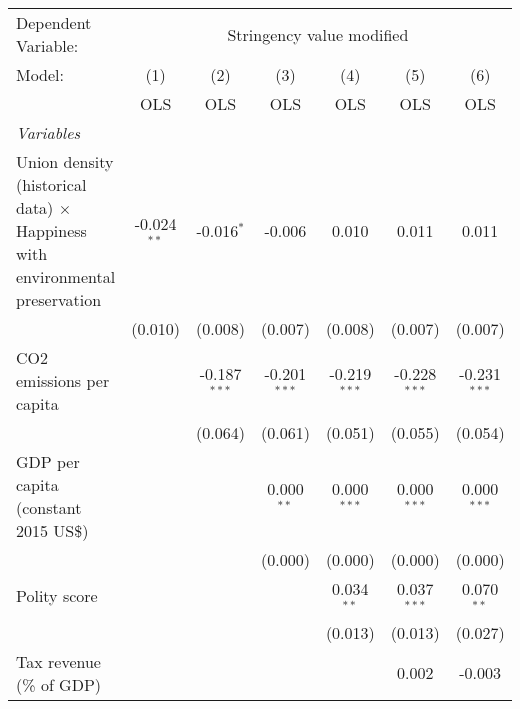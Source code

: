 
\begingroup
\centering
\begin{tabular}{lcccccc}
   \toprule
   Dependent Variable: & \multicolumn{6}{c}{Stringency value modified}\\
   Model:                                                                              & (1)           & (2)            & (3)            & (4)            & (5)            & (6)\\  
                                                                                       &  OLS          & OLS            & OLS            & OLS            & OLS            & OLS\\  
   \midrule
   \emph{Variables}\\
   Union density (historical data) $\times$ Happiness with environmental preservation  & -0.024$^{**}$ & -0.016$^{*}$   & -0.006         & 0.010          & 0.011          & 0.011\\   
                                                                                       & (0.010)       & (0.008)        & (0.007)        & (0.008)        & (0.007)        & (0.007)\\   
   CO2 emissions per capita                                                            &               & -0.187$^{***}$ & -0.201$^{***}$ & -0.219$^{***}$ & -0.228$^{***}$ & -0.231$^{***}$\\   
                                                                                       &               & (0.064)        & (0.061)        & (0.051)        & (0.055)        & (0.054)\\   
   GDP per capita (constant 2015 US\$)                                                 &               &                & 0.000$^{**}$   & 0.000$^{***}$  & 0.000$^{***}$  & 0.000$^{***}$\\   
                                                                                       &               &                & (0.000)        & (0.000)        & (0.000)        & (0.000)\\   
   Polity score                                                                        &               &                &                & 0.034$^{**}$   & 0.037$^{***}$  & 0.070$^{**}$\\   
                                                                                       &               &                &                & (0.013)        & (0.013)        & (0.027)\\   
   Tax revenue (\% of GDP)                                                             &               &                &                &                & 0.002          & -0.003\\   

\end{tabular}
